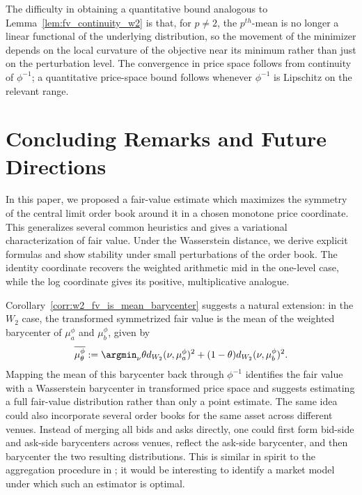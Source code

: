 The difficulty in obtaining a quantitative bound analogous to Lemma~\ref{lem:fv_continuity_w2}
is that, for $p \neq 2$, the $p^{th}$-mean is no longer a linear functional of the
underlying distribution, so the movement of the minimizer depends on the local
curvature of the objective near its minimum rather than just on the perturbation level.
The convergence in price space follows from continuity of $\phi^{-1}$; a quantitative price-space bound follows whenever $\phi^{-1}$ is Lipschitz on the relevant range.


\section{Concluding Remarks and Future Directions}

\noindent In this paper, we proposed a fair-value estimate which maximizes the
symmetry of the central limit order book around it in a chosen monotone price coordinate. This generalizes several
common heuristics and gives a variational characterization of fair value. Under
the Wasserstein distance, we derive explicit formulas and show stability under
small perturbations of the order book. The identity coordinate recovers the weighted arithmetic mid in the one-level case, while the log coordinate gives its positive, multiplicative analogue.

Corollary~\ref{corr:w2_fv_is_mean_barycenter} suggests a natural extension: in
the $W_2$ case, the transformed symmetrized fair value is the mean of the weighted
barycenter of $\mu_a^\phi$ and $\mu_b^\phi$, given by
%
    \[\overline{\mu_\theta^\phi} := \argmin_{\nu}
\theta d_{W_2}(\nu,\mu_a^\phi)^2+(1-\theta)d_{W_2}(\nu,\mu_b^\phi)^2.\]
%
Mapping the mean of this barycenter back through $\phi^{-1}$ identifies the fair value with a Wasserstein barycenter in transformed price space and suggests
estimating a full fair-value distribution rather than only a point estimate. The
same idea could also incorporate several order books for the same asset across
different venues. Instead of merging all bids and asks directly, one could first
form bid-side and ask-side barycenters across venues, reflect the ask-side
barycenter, and then barycenter the two resulting distributions. This is similar
in spirit to the aggregation procedure in \cite{raban2024_aggregate_ratings_wasserstein_barycenters};
it would be interesting to identify a market model under which such an estimator
is optimal.

